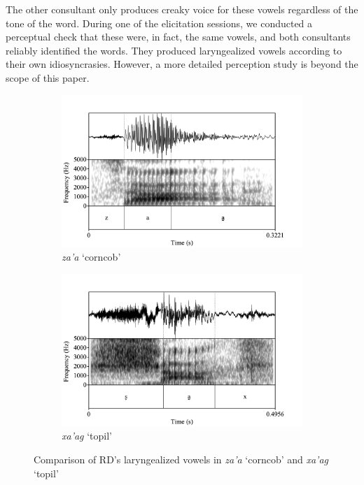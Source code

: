 \documentclass[12pt, letterpaper]{article}
\begin{document}
The other consultant only produces creaky voice for these vowels regardless of the tone of the word. During one of the elicitation sessions, we conducted a perceptual check that these were, in fact, the same vowels, and both consultants reliably identified the words. They produced laryngealized vowels according to their own idiosyncrasies. However, a more detailed perception study is beyond the scope of this paper. 
\begin{figure}[!h]
	\centering
	\begin{subfigure}{.5\textwidth}
		\centering
		\includegraphics[width=\linewidth]{Images/RD_za'a.png}
		\caption{\textit{za'a} `corncob'}
		\label{fig:RDza'a}
	\end{subfigure}%
	\begin{subfigure}{.5\textwidth}
		\centering
		\includegraphics[width=\linewidth]{Images/RD_xa'ag.png}
		\caption{\textit{xa'ag} `topil'}
		\label{fig:RDxa'ag}
	\end{subfigure}
	\caption{Comparison of RD's laryngealized vowels in \textit{za'a} `corncob' and \textit{xa'ag} `topil'}
	\label{fig:RDLaryngeal}
\end{figure}
\end{document}
